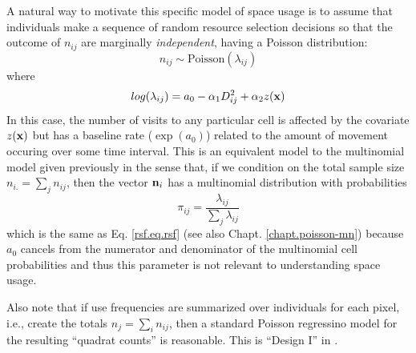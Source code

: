 A natural way to motivate this specific model of space usage is to
assume that individuals make a sequence of random resource selection
decisions so that the outcome of $n_{ij}$ are marginally {\it
  independent}, having a Poisson distribution:
\[
 n_{ij} \sim \mbox{Poisson}( \lambda_{ij})
\]
where
\[
 log(\lambda_{ij}) = a_{0} -\alpha_{1} D_{ij}^{2} +  \alpha_{2} z({\bf x})
\]
In this case, the number of visits to any particular cell is affected
by the covariate $z({\bf x})$ but has a baseline rate ($\exp(a_{0})$)
related to the amount of movement occuring over some time interval.
This is an equivalent model to the multinomial
model given previously in the sense that, if we condition on the total
sample size $n_{i.} = \sum_{j} n_{ij}$, then the vector ${\bf n}_{i}$
has a multinomial distribution with probabilities
\[
 \pi_{ij} = \frac{\lambda_{ij}}{ \sum_{j} \lambda_{ij}}
\]
which is the same as Eq. \ref{rsf.eq.rsf} (see also
Chapt. \ref{chapt.poisson-mn}) because $a_{0}$ cancels
from the numerator and denominator of the
multinomial cell probabilities
and thus this parameter is not relevant to understanding
space usage.

Also note that if use frequencies are summarized over individuals for
each pixel, i.e.,
create the totals $n_j = \sum_i n_{ij}$, then
 a standard Poisson regressino model for the resulting  ``quadrat
 counts'' is reasonable. This is ``Design I'' in \citet{manly_etal:2002}.


